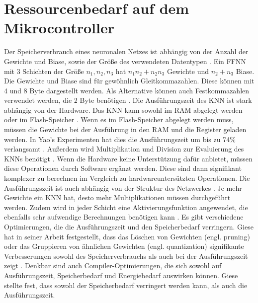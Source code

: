 \section{Ressourcenbedarf auf dem Mikrocontroller}
Der Speicherverbrauch eines neuronalen Netzes ist abhängig von der Anzahl der Gewichte und Biase, sowie der Größe des verwendeten Datentypen \cite{kubikThesis}.
Ein FFNN mit 3 Schichten der Größe $n_1, n_2, n_3$ hat $n_1 n_2 + n_2 n_3$ Gewichte und $n_2 + n_3$ Biase.
Die Gewichte und Biase sind für gewöhnlich Gleitkommazahlen. Diese können mit 4 und 8 Byte dargestellt werden.
Als Alternative können auch Festkommazahlen verwendet werden, die 2 Byte benötigen \cite{gieseThesis}.
\newline
\newline
Die Ausführungszeit des KNN ist stark abhängig von der Hardware.
Das KNN kann sowohl im RAM abgelegt werden oder im Flash-Speicher \cite{engelhardtThesis}.
Wenn es im Flash-Speicher abgelegt werden muss, müssen die Gewichte bei der Ausführung in den RAM und die Register geladen werden.
In Yao's Experimenten hat dies die Ausführungszeit um bis zu 74\% verlangsamt \cite{yaoThesis}.
\newline
\newline
Außerdem wird Multiplikation und Division zur Evaluierung des KNNs benötigt \cite{engelhardtThesis}.
Wenn die Hardware keine Unterstützung dafür anbietet, müssen diese Operationen durch Software ergänzt werden.
Diese sind dann signifikant komplexer zu berechnen im Vergleich zu hardwareuntersützten Operationen.
\newline
\newline
Die Ausführungszeit ist auch abhängig von der Struktur des Netzwerkes \cite{gieseThesis}.
Je mehr Gewichte ein KNN hat, desto mehr Multiplikationen müssen durchgeführt werden.
Zudem wird in jeder Schicht eine Aktivierungsfunktion angewendet, die ebenfalls sehr aufwendige Berechnungen benötigen kann \cite{venzkeArticle}.
\newline
\newline
Es gibt verschiedene Optimierungen, die die Ausführungszeit und den Speicherbedarf verringern.
Giese hat in seiner Arbeit festgestellt, dass das Löschen von Gewichten (engl. pruning) oder das Gruppieren von ähnlichen Gewichten (engl. quantization)
signifikante Verbesserungen sowohl des Speicherverbrauchs als auch bei der Ausführungszeit zeigt \cite{gieseThesis}.
Denkbar sind auch Compiler-Optimierungen, die sich sowohl auf Ausführungszeit, Speicherbedarf und Energiebedarf auswirken können.
Giese stellte fest, dass sowohl der Speicherbedarf verringert werden kann, als auch die Ausführungszeit.